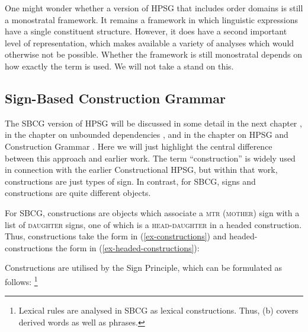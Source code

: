 \documentclass[output=paper,biblatex,babelshorthands,newtxmath,draftmode,colorlinks,citecolor=brown]{langscibook}
\begin{document}
One might wonder whether a version of HPSG that includes order domains is still a monostratal
framework. It remains a framework in which linguistic expressions have a single constituent
structure. However, it does have a second important level of representation, which makes available a
variety of analyses which would otherwise not be possible. Whether the framework is still
monostratal depends on how exactly the term is used. We will not take a stand on this. 

\subsection{Sign-Based Construction Grammar}\label{sec:prop7.2}
\label{prop:sec-sbcg}

The SBCG version of HPSG will be discussed in some detail in the next chapter
\citep*[\page~]{chapters/evolution}, in the chapter on
unbounded dependencies \citep[Section~\ref{udc:sec-SBCG}]{chapters/udc}, and in the chapter on HPSG and
Construction Grammar \citep[Section~\ref{cxg:sec-sbcg}]{chapters/cxg}. Here we will just highlight
the central difference between this approach and earlier work. The term ``construction'' is widely
used in connection with the earlier Constructional HPSG, but within that work, constructions are
just types of sign. In contrast, for SBCG, signs and constructions are quite different objects. 

For SBCG, constructions are objects which associate a \textsc{mtr} (\textsc{mother}) sign with a
list of \textsc{daughter} signs, one of which is a \textsc{head-daughter} in a headed
construction. Thus, constructions take the form in (\ref{ex-constructions}) and headed-constructions
the form in (\ref{ex-headed-constructions}): 

\eal\label{ex:prop48}
\ex\label{ex:prop48a}\label{ex-constructions}
	
	
\ex\label{ex:prop48b}\label{ex-headed-constructions}
\zl

\noindent
Constructions are utilised by the Sign Principle, which can be formulated as follows:%
%
\footnote{Lexical rules are analysed in SBCG as lexical constructions. Thus, (b) covers derived words as well as phrases.}
%
\end{document}
